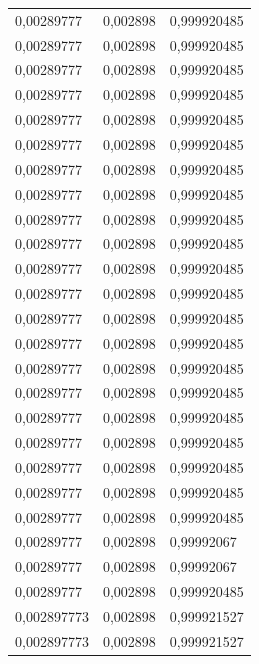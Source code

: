 \begin{center}
\begin{longtable}{|l|l|l|}
0,00289777         & 0,002898              & 0,999920485  \\
0,00289777         & 0,002898              & 0,999920485  \\
0,00289777         & 0,002898              & 0,999920485  \\
0,00289777         & 0,002898              & 0,999920485  \\
0,00289777         & 0,002898              & 0,999920485  \\
0,00289777         & 0,002898              & 0,999920485  \\
0,00289777         & 0,002898              & 0,999920485  \\
0,00289777         & 0,002898              & 0,999920485  \\
0,00289777         & 0,002898              & 0,999920485  \\
0,00289777         & 0,002898              & 0,999920485  \\
0,00289777         & 0,002898              & 0,999920485  \\
0,00289777         & 0,002898              & 0,999920485  \\
0,00289777         & 0,002898              & 0,999920485  \\
0,00289777         & 0,002898              & 0,999920485  \\
0,00289777         & 0,002898              & 0,999920485  \\
0,00289777         & 0,002898              & 0,999920485  \\
0,00289777         & 0,002898              & 0,999920485  \\
0,00289777         & 0,002898              & 0,999920485  \\
0,00289777         & 0,002898              & 0,999920485  \\
0,00289777         & 0,002898              & 0,999920485  \\
0,00289777         & 0,002898              & 0,999920485  \\
0,00289777         & 0,002898              & 0,99992067   \\
0,00289777         & 0,002898              & 0,99992067   \\
0,00289777         & 0,002898              & 0,999920485  \\
0,002897773        & 0,002898              & 0,999921527  \\
0,002897773        & 0,002898              & 0,999921527  \\

\end{longtable}
\end{center}
